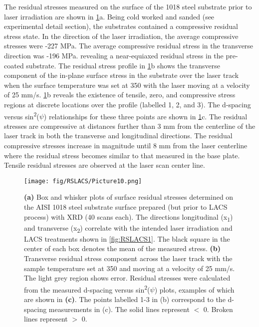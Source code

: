 	
		The residual stresses measured on the surface of the 1018 steel substrate prior to laser irradiation are shown in \ref{fig:RSLACS10}a. Being cold worked and sanded (see experimental detail section), the substrates contained a compressive residual stress state. In the direction of the laser irradiation, the average compressive stresses were -227 MPa. The average compressive residual stress in the transverse direction was -196 MPa. revealing a near-equiaxed residual stress in the pre-coated substrate. The residual stress profile in \ref{fig:RSLACS10}b shows the transverse component of the in-plane surface stress in the substrate over the laser track when the surface temperature was set at 350 \celsius{} with the laser moving at a velocity of 25 mm/s. \ref{fig:RSLACS10}b reveals the existence of tensile, zero, and compressive stress regions at discrete locations over the profile (labelled 1, 2, and 3). The d-spacing versus sin\textsuperscript{2}($ \psi $)\textit{ }relationships for these three points are shown in \ref{fig:RSLACS10}c. The residual stresses are compressive at distances further than 3 mm from the centerline of the laser track in both the transverse and longitudinal directions. The residual compressive stresses increase in magnitude until 8 mm from the laser centerline where the residual stress becomes similar to that measured in the base plate. Tensile residual stresses are observed at the laser scan center line. 
		
		\begin{figure}
			\centering
			\texttt{[image: fig/RSLACS/Picture10.png]}
			\caption[Surface residual stresses determined on the AISI 1018 steel substrate surface prepared (but prior to LACS process) with XRD]{\textbf{(a)} Box and whisker plots of surface residual stresses determined on the AISI 1018 steel substrate surface prepared (but prior to LACS process) with XRD (40 scans each). The directions longitudinal (x\textsubscript{1}) and transverse (x\textsubscript{2}) correlate with the intended laser irradiation and LACS treatments shown in \ref{fig:RSLACS1}. The black square in the center of each box denotes the mean of the measured stress. \textbf{(b)} Transverse residual stress component across the laser track with the sample temperature set at 350 \celsius{} and moving at a velocity of 25 mm/s. The light grey region shows error. Residual stresses were calculated from the measured d-spacing versus sin\textsuperscript{2}($ \psi $) plots, examples of which are shown in \textbf{(c)}. The points labelled 1-3 in (b) correspond to the d-spacing measurements in (c). The solid lines represent  $<$ 0. Broken lines represent  $>$ 0.}
			\label{fig:RSLACS10}
		\end{figure}
	

